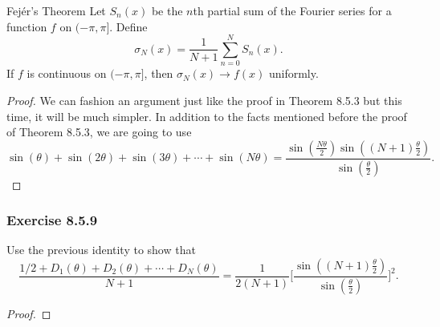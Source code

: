 \begin{theorem}{Fej\'{e}r's Theorem }{}
   Let \( S_{n}(x)  \) be the \( n \)th partial sum of the Fourier series for a function \( f  \) on \( (- \pi ,\pi ] \). Define 
   \[  \sigma_{N}(x) = \frac{ 1 }{ N+1 } \sum_{ n=0 }^{ N } S_{n}(x). \]
   If \( f  \) is continuous on \( (- \pi ,\pi] \), then \( \sigma_{N}(x) \to f(x)  \) uniformly.
\end{theorem}

\begin{proof}
We can fashion an argument just like the proof in Theorem 8.5.3 but this time, it will be much simpler. In addition to the facts mentioned before the proof of Theorem 8.5.3, we are going to use 
\[  \sin(\theta) + \sin(2 \theta) + \sin(3 \theta) + \dotsb + \sin(N \theta) = \frac{ \sin(\frac{ N \theta }{ 2  } ) \sin((N+1) \frac{ \theta }{ 2  } ) }{  \sin(\frac{ \theta }{ 2 } ) }.  \]
\end{proof}

\subsubsection{Exercise 8.5.9} Use the previous identity to show that
\[  \frac{ 1 /2 + D_{1}(\theta) + D_{2}(\theta) + \dotsb  + D_{N}(\theta) }{ N+1  } = \frac{ 1 }{ 2 (N+1)  } \Bigg[\frac{ \sin((N+1) \frac{ \theta }{ 2 } ) }{ \sin( \frac{ \theta  }{ 2 } ) } \Bigg]^{2}.  \]
\begin{proof}

\end{proof}

